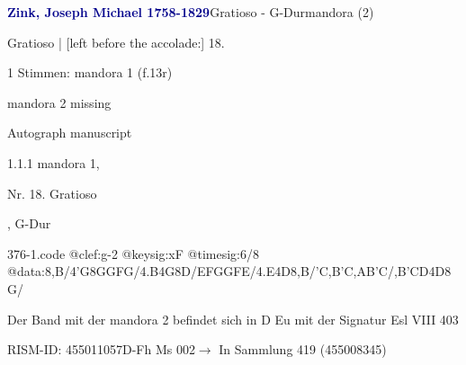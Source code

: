 \documentclass[twocolumn]{book}
\begin{document}
\par \vspace{7pt} \textcolor{darkblue}{\textbf{Zink, Joseph Michael  1758-1829}}\hfillplus{\textbf{[376]}}\newline Gratioso - G-Dur\newline mandora (2)
\par \begin{itshape}[f.13r, at left:] Gratioso | [left before the accolade:] 18.\end{itshape} 
\par \textcolor{darkblue}{}  1 Stimmen: mandora 1  (f.13r)\newline \begin{small} mandora 2 missing\end{small} \newline Autograph manuscript
\par 1.1.1  mandora 1, \begin{itshape}Nr. 18. Gratioso\end{itshape}, G-Dur  
\begin{filecontents*}{376-1.code}
@clef:g-2
@keysig:xF
@timesig:6/8
@data:8,B/4'G8GGFG/4.B4G8D/{EF}GGFE/4.E4D8,B/'C,B'C,AB'C/{,B'C}D4D8G/
\end{filecontents*}
\newline
%
\par Der Band mit der mandora 2 befindet sich in D Eu mit der Signatur Esl VIII 403
\par RISM-ID: 455011057\newline D-Fh  Ms 002\newline $\rightarrow$ In Sammlung 419 (455008345)
      
\end{document}
